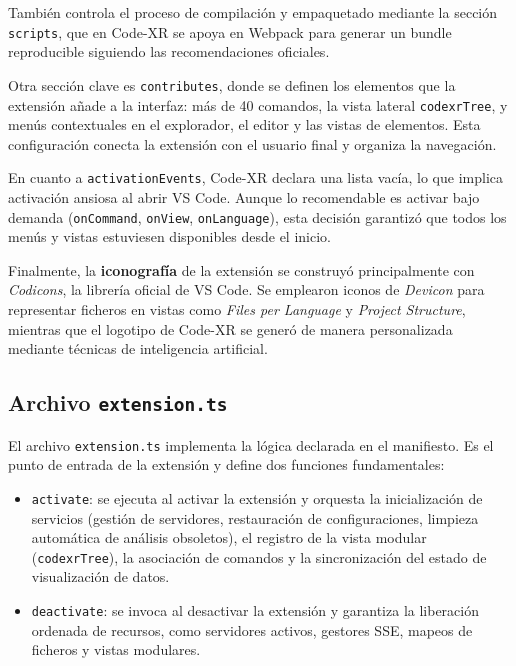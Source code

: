 \documentclass[a4paper, 12pt]{book}
\begin{document}
También controla el proceso de compilación y empaquetado mediante la sección \texttt{scripts}, que en Code-XR se apoya en Webpack para generar un bundle reproducible siguiendo las recomendaciones oficiales\cite{vscode-bundling}.  

Otra sección clave es \texttt{contributes}, donde se definen los elementos que la extensión añade a la interfaz: más de 40 comandos, la vista lateral \texttt{codexrTree}, y menús contextuales en el explorador, el editor y las vistas de elementos. Esta configuración conecta la extensión con el usuario final y organiza la navegación.  

En cuanto a \texttt{activationEvents}, Code-XR declara una lista vacía, lo que implica activación ansiosa al abrir VS Code. Aunque lo recomendable es activar bajo demanda (\texttt{onCommand}, \texttt{onView}, \texttt{onLanguage}), esta decisión garantizó que todos los menús y vistas estuviesen disponibles desde el inicio.  

Finalmente, la \textbf{iconografía} de la extensión se construyó principalmente con \emph{Codicons}, la librería oficial de VS Code\cite{codicons}. Se emplearon iconos de \emph{Devicon}\cite{devicon} para representar ficheros en vistas como \emph{Files per Language} y \emph{Project Structure}, mientras que el logotipo de Code-XR se generó de manera personalizada mediante técnicas de inteligencia artificial.

\subsection{Archivo \texttt{extension.ts}}
El archivo \texttt{extension.ts} implementa la lógica declarada en el manifiesto. Es el punto de entrada de la extensión y define dos funciones fundamentales:  
\begin{itemize}
  \item \texttt{activate}: se ejecuta al activar la extensión y orquesta la inicialización de servicios (gestión de servidores, restauración de configuraciones, limpieza automática de análisis obsoletos), el registro de la vista modular (\texttt{codexrTree}), la asociación de comandos y la sincronización del estado de visualización de datos.  
  \item \texttt{deactivate}: se invoca al desactivar la extensión y garantiza la liberación ordenada de recursos, como servidores activos, gestores SSE, mapeos de ficheros y vistas modulares.  
\end{itemize}
\end{document}
